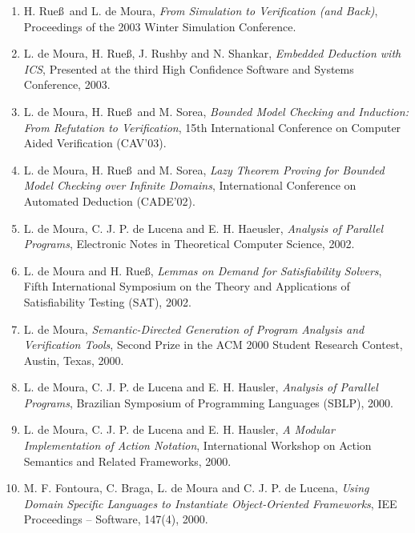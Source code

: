 \documentclass[11pt,a4paper]{article}
\begin{document}
\begin{enumerate}[leftmargin=*,itemsep=0.5ex,topsep=0.6ex]
\item H. Rue\ss\ and L. de Moura,
      {\em From Simulation to Verification (and Back)},
      Proceedings of the 2003 Winter Simulation Conference.

\item L. de Moura, H. Rue\ss, J. Rushby and N. Shankar,
      {\em Embedded Deduction with ICS},
      Presented at the third High Confidence Software and Systems Conference, 2003.

\item L. de Moura, H. Rue\ss\ and M. Sorea,
      {\em Bounded Model Checking and Induction: From Refutation to Verification},
      15th International Conference on Computer Aided Verification (CAV'03).

\item L. de Moura, H. Rue\ss\ and M. Sorea,
      {\em Lazy Theorem Proving for Bounded Model Checking over Infinite Domains},
      International Conference on Automated Deduction (CADE'02).

\item L. de Moura, C. J. P. de Lucena and E. H. Haeusler,
      {\em Analysis of Parallel Programs},
      Electronic Notes in Theoretical Computer Science, 2002.

\item L. de Moura and H. Rue\ss,
      {\em Lemmas on Demand for Satisfiability Solvers},
      Fifth International Symposium on the Theory and Applications of Satisfiability Testing (SAT), 2002.

\item L. de Moura,
      {\em Semantic-Directed Generation of Program Analysis and Verification Tools},
      Second Prize in the ACM 2000 Student Research Contest, Austin, Texas, 2000.

\item L. de Moura, C. J. P. de Lucena and E. H. Hausler,
      {\em Analysis of Parallel Programs},
      Brazilian Symposium of Programming Languages (SBLP), 2000.

\item L. de Moura, C. J. P. de Lucena and E. H. Hausler,
      {\em A Modular Implementation of Action Notation},
      International Workshop on Action Semantics and Related Frameworks, 2000.

\item M. F. Fontoura, C. Braga, L. de Moura and C. J. P. de Lucena,
      {\em Using Domain Specific Languages to Instantiate Object-Oriented Frameworks},
      IEE Proceedings -- Software, 147(4), 2000.


\end{enumerate}
\end{document}
